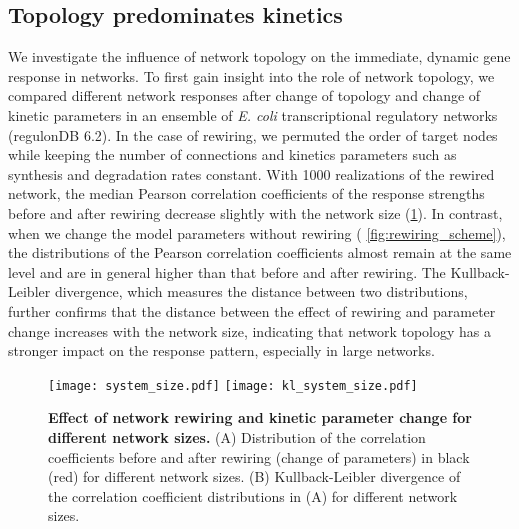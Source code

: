 \subsection{Topology predominates kinetics}
\label{sec:topology_kinetics}
We investigate the influence of network topology on the immediate, dynamic gene response in networks. 
To first gain insight into the role of network topology, we compared
different network responses after change of topology and change of kinetic
parameters in an ensemble of \emph{E. coli} transcriptional
regulatory networks (regulonDB 6.2).
In the case of rewiring, we permuted the order of target nodes while keeping
the number of connections and kinetics parameters such as synthesis and 
degradation rates constant. With 1000 realizations of the
rewired network, the median Pearson correlation coefficients of the response
strengths before and after rewiring decrease slightly with the network size 
(\ref{fig:system_size}). 
In contrast, when we 
change the model parameters without rewiring (%
\ref{fig:rewiring_scheme}), the distributions of the Pearson correlation coefficients almost remain
at the same level and 
are in general higher than that before and after rewiring. The Kullback-Leibler
divergence, which measures the distance between two distributions, further 
confirms that the distance between the effect of rewiring and parameter change 
increases with the network size, indicating that network topology has a stronger 
impact on the response pattern, especially in large networks. 

\begin{figure}[!ht]
\begin{center}
\texttt{[image: system\_size.pdf]}
\texttt{[image: kl\_system\_size.pdf]}
\end{center}
\caption[Effect of rewiring and parameter change]{
{\bf Effect of network rewiring and kinetic parameter change for different network
sizes.} 
(A) Distribution of the correlation coefficients
before and after rewiring (change of parameters) in black (red) for 
different network sizes. (B) Kullback-Leibler divergence of the 
correlation coefficient distributions in (A) for different network
sizes.
}
\label{fig:system_size}
\end{figure}

